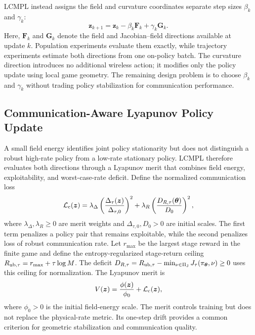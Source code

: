 \documentclass[conference]{IEEEtran}
\newcommand{\bF}{\bm{F}}
\newcommand{\bG}{\bm{G}}
\newcommand{\bz}{\bm{z}}
\newcommand{\btheta}{\bm{\theta}}
\begin{document}
LCMPL instead assigns the field and curvature coordinates separate step sizes $\beta_k$ and $\gamma_k$:
\begin{equation}
\bz_{k+1}=\bz_k-\beta_k\bF_k+\gamma_k\bG_k.
\label{eq:update}
\end{equation}
Here, $\bF_k$ and $\bG_k$ denote the field and Jacobian--field directions available at update $k$.
Population experiments evaluate them exactly, while trajectory experiments estimate both directions from one on-policy batch.
The curvature direction introduces no additional wireless action; it modifies only the policy update using local game geometry.
The remaining design problem is to choose $\beta_k$ and $\gamma_k$ without trading policy stabilization for communication performance.

\subsection{Communication-Aware Lyapunov Policy Update}
A small field energy identifies joint policy stationarity but does not distinguish a robust high-rate policy from a low-rate stationary policy.
LCMPL therefore evaluates both directions through a Lyapunov merit that combines field energy, exploitability, and worst-case-rate deficit.
Define the normalized communication loss
\[
\mathcal L_{\rm c}(\bz)=
\lambda_\Delta\left(\frac{\Delta_\tau(\bz)}{\Delta_{\tau,0}}\right)^2
+\lambda_R\left(\frac{D_{R,\tau}(\btheta)}{D_0}\right)^2,
\]
where $\lambda_\Delta,\lambda_R\geq0$ are merit weights and $\Delta_{\tau,0},D_0>0$ are initial scales.
The first term penalizes a policy pair that remains exploitable, while the second penalizes loss of robust communication rate.
Let $r_{\max}$ be the largest stage reward in the finite game and define the entropy-regularized stage-return ceiling $R_{{\rm ub},\tau}=r_{\max}+\tau\log M$.
The deficit $D_{R,\tau}=R_{{\rm ub},\tau}-\min_{\nu\in\Pi_{\rm J}}J_\tau(\pi_{\btheta},\nu)\geq0$ uses this ceiling for normalization.
The Lyapunov merit is
\begin{equation}
V(\bz)=\frac{\phi(\bz)}{\phi_0}+\mathcal L_{\rm c}(\bz),
\label{eq:merit}
\end{equation}
where $\phi_0>0$ is the initial field-energy scale.
The merit controls training but does not replace the physical-rate metric.
Its one-step drift provides a common criterion for geometric stabilization and communication quality.
\end{document}
